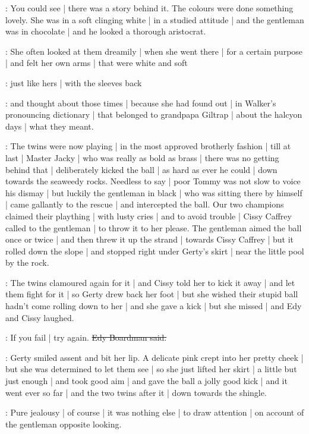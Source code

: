 \gertyRomantic:
You could see |
there was a story behind it.
The colours were done something lovely.
She was in a soft clinging white |
in a studied attitude |
and the gentleman was in chocolate |
and he looked a thorough aristocrat.

\gertyReal:
She often looked at them dreamily |%
when she went there |
for a certain purpose |
and felt her own arms |
that were white and soft

\gertyRomantic:
just like hers |
with the sleeves back

\gertyReal:
and thought about those times |
because she had found out |
in Walker's pronouncing dictionary |
that belonged to grandpapa Giltrap |
about the halcyon days |
what they meant.

:
The twins were now playing |
in the most approved brotherly fashion |
till at last |
Master Jacky |
who was really as bold as brass |
there was no getting behind that |
deliberately kicked the ball |
as hard as ever he could |
down towards the seaweedy rocks.
Needless to say |
poor Tommy was not slow to voice his dismay |
but luckily the gentleman in black |
who was sitting there by himself |
came gallantly to the rescue |
and intercepted the ball.%
Our two champions
claimed their plaything |
with lusty cries |
and to avoid trouble |
Cissy Caffrey called to the gentleman |
to throw it to her please.
The gentleman aimed the ball
once or twice |
and then threw it up the strand |
towards Cissy Caffrey |
but it rolled down the slope |
and stopped right under Gerty's skirt |
near the little pool by the rock.

\gertyJudgy:
The twins clamoured again for it |
and Cissy told her to kick it away |
and let them fight for it |
so Gerty drew back her foot |
but she wished
their stupid ball hadn't come rolling down to her |
and she gave a kick |
but she missed |
and Edy and Cissy laughed.

\edy:
If you fail |
try again.
\sout{Edy Boardman said.}

\gertyReal:
Gerty smiled assent and bit her lip.%
A delicate pink
crept into her pretty cheek |
but she was determined to let them see |
so she just lifted her skirt |
a little but just enough |
and took good aim |
and gave the ball a jolly good kick |
and it went ever so far |
and the two twins after it |
down towards the shingle.

\gertyJudgy:
Pure jealousy |
of course |
it was nothing else |
to draw attention |
on account of the gentleman opposite looking.

